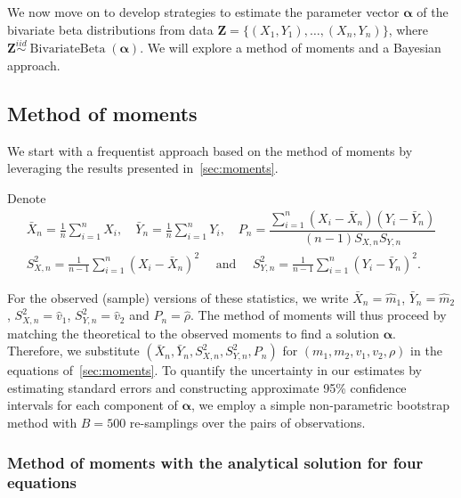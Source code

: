 \documentclass[a4paper, notitlepage, 10pt]{article}
\newcommand{\dd}{\boldsymbol{Z}}
\theoremstyle{definition}
\begin{document}
We now move on to develop strategies to estimate the parameter vector $\boldsymbol{\alpha}$ of the bivariate beta distributions from data $\dd = \{ (X_1, Y_1), \dots, (X_n, Y_n) \}$, where $\dd \overset{iid}{\sim} \operatorname{Bivariate Beta}(\boldsymbol{\alpha})$. 
We will explore a method of moments and a Bayesian approach.

\subsection{Method of moments}

We start with a frequentist approach based on the method of moments by leveraging the results presented in~\autoref{sec:moments}.

Denote 
\begin{equation}
    \label{eq:empirical-moments}
    \begin{gathered}
    \bar{X}_n = \frac{1}{n}\sum_{i=1}^n X_i, \quad \bar{Y}_n = \frac{1}{n}\sum_{i=1}^n Y_i,  \quad P_n = \dfrac{\sum_{i=1}^n (X_i - \bar{X}_n)(Y_i - \bar{Y}_n)}{(n-1)S_{X,n} S_{Y,n}} \\ 
    S_{X,n}^2 = \frac{1}{n-1}\sum_{i=1}^n {(X_i - \bar{X}_n)}^2 \quad  \text{ and }\quad S_{Y,n}^2 = \frac{1}{n-1}\sum_{i=1}^n {(Y_i - \bar{Y}_n)}^2.
    \end{gathered}
\end{equation}

For the observed (sample) versions of these statistics, we write $\bar{X}_n = \hat{m}_1$, $\bar{Y}_n = \hat{m}_2$, $S^2_{X,n} = \hat{v}_1$, $S^2_{Y,n} = \hat{v}_2$ and $P_n = \hat\rho$.
The method of moments will thus proceed by matching the theoretical to the observed moments to find a solution $\boldsymbol{\alpha}$.
Therefore, we substitute $(\bar{X}_n, \bar{Y}_n, S_{X,n}^2, S_{Y,n}^2, P_n)$ for  $(m_1, m_2, v_1, v_2, \rho)$ in the equations of~\autoref{sec:moments}.
To quantify the uncertainty in our estimates by estimating standard errors and constructing approximate 95\% confidence intervals for each component of $\boldsymbol\alpha$, we employ a simple non-parametric bootstrap~\cite[]{efron1979bootstrap} method with $B=500$ re-samplings over the pairs of observations. 

\subsubsection*{Method of moments with the analytical solution for four equations}
\end{document}

